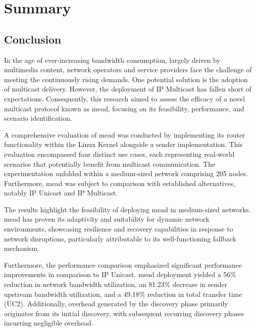 

\chapter{Summary} %
\label{chap:Summary}

\section{Conclusion} %
\label{sec:Conclusion}
In the age of ever-increasing bandwidth consumption, largely driven by
    multimedia content, network operators and service providers face the
    challenge of meeting the continuously rising demands.
One potential solution is the adoption of multicast delivery.
However, the deployment of IP Multicast has fallen short of expectations.
Consequently, this research aimed to assess the efficacy of a novel multicast
    protocol known as \gls{mead}, focusing on its feasibility, performance, and
    scenario identification.

A comprehensive evaluation of \gls{mead} was conducted by implementing its
    router functionality within the Linux Kernel alongside a sender
    implementation.
This evaluation encompassed four distinct use cases, each representing
    real-world scenarios that potentially benefit from multicast communication.
The experimentation unfolded within a medium-sized network comprising 205
    nodes.
Furthermore, \gls{mead} was subject to comparison with established
    alternatives, notably IP Unicast and IP Multicast.

The results highlight the feasibility of deploying \gls{mead} in medium-sized
    networks.
\gls{mead} has proven its adaptivity and suitability for dynamic network
    environments, showcasing resilience and recovery capabilities in response
    to network disruptions, particularly attributable to its well-functioning
    fallback mechanism.

Furthermore, the performance comparison emphasized significant performance
    improvements in comparison to IP Unicast.
\gls{mead} deployment yielded a 56\% reduction in network bandwidth
    utilization, an 81.23\% decrease in sender upstream bandwidth utilization,
    and a 49.18\% reduction in total transfer time (UC2).
Additionally, overhead generated by the discovery phase primarily originates
    from its initial discovery, with subsequent recurring discovery phases
    incurring negligible overhead.

